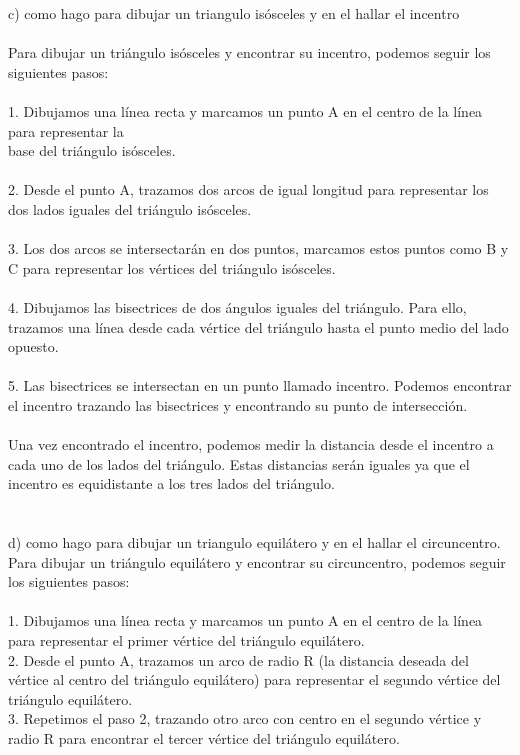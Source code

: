 \documentclass{article}
\begin{document}
c) como hago para dibujar un triangulo isósceles y en el hallar el incentro \\
\\ 
Para dibujar un triángulo isósceles y encontrar su incentro, podemos seguir los siguientes pasos:\\
\\
1. Dibujamos una línea recta y marcamos un punto A en el centro de la línea para representar la\\
base del triángulo isósceles.\\
\\
2. Desde el punto A, trazamos dos arcos de igual longitud para representar los dos lados iguales del triángulo isósceles.\\
\\
3. Los dos arcos se intersectarán en dos puntos, marcamos estos puntos como B y C para representar los vértices del triángulo isósceles.\\
\\
4. Dibujamos las bisectrices de dos ángulos iguales del triángulo. Para ello, trazamos una línea desde cada vértice del triángulo hasta el punto medio del lado opuesto.\\
\\
5. Las bisectrices se intersectan en un punto llamado incentro. Podemos encontrar el incentro trazando las bisectrices y encontrando su punto de intersección.\\
\\
Una vez encontrado el incentro, podemos medir la distancia desde el incentro a cada uno de los lados del triángulo. Estas distancias serán iguales ya que el incentro es equidistante a los tres lados del triángulo.\\
\\
\\
d) como hago para dibujar un triangulo equilátero y en el hallar el circuncentro.\\
Para dibujar un triángulo equilátero y encontrar su circuncentro, podemos seguir los siguientes pasos:\\
\\
1. Dibujamos una línea recta y marcamos un punto A en el centro de la línea para representar el primer vértice del triángulo equilátero.\\
2. Desde el punto A, trazamos un arco de radio R (la distancia deseada del vértice al centro del triángulo equilátero) para representar el segundo vértice del triángulo equilátero.\\
3. Repetimos el paso 2, trazando otro arco con centro en el segundo vértice y radio R para encontrar el tercer vértice del triángulo equilátero.\\
\end{document}
